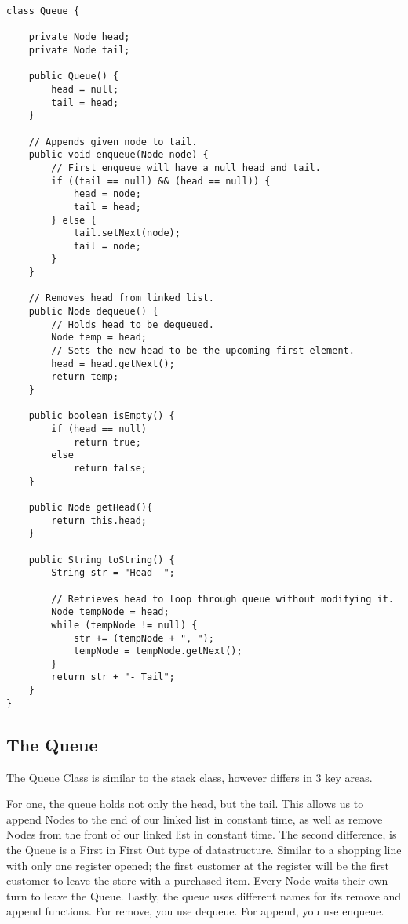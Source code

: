 \documentclass[letterpaper, 10pt,DIV=13]{scrartcl}
\numberwithin{equation}{section} %
\numberwithin{figure}{section} %
\numberwithin{table}{section} %
\begin{document}
\lstset{numbers=left, numberstyle=\tiny, stepnumber=1, numbersep=5pt, basicstyle=\footnotesize\ttfamily}
\begin{lstlisting}[frame=single, ]
class Queue {

    private Node head;
    private Node tail;

    public Queue() {
        head = null;
        tail = head;
    }

    // Appends given node to tail.
    public void enqueue(Node node) {
        // First enqueue will have a null head and tail.
        if ((tail == null) && (head == null)) {
            head = node;
            tail = head;
        } else {
            tail.setNext(node);
            tail = node;
        }
    }

    // Removes head from linked list.
    public Node dequeue() {
        // Holds head to be dequeued.
        Node temp = head;
        // Sets the new head to be the upcoming first element.
        head = head.getNext();
        return temp;
    }

    public boolean isEmpty() {
        if (head == null)
            return true;
        else
            return false;
    }

    public Node getHead(){
        return this.head;
    }

    public String toString() {
        String str = "Head- ";

        // Retrieves head to loop through queue without modifying it.
        Node tempNode = head;
        while (tempNode != null) {
            str += (tempNode + ", ");
            tempNode = tempNode.getNext();
        }
        return str + "- Tail";
    }
}
\end{lstlisting}
\subsection{The Queue}
The Queue Class is similar to the stack class, however differs in 3 key areas. 

For one, the queue holds not only the head, but the tail. This allows us to append Nodes to the end of our linked list in constant time, as well as remove Nodes from the front of our linked list in constant time. The second difference, is the Queue is a First in First Out type of datastructure. Similar to a shopping line with only one register opened; the first customer at the register will be the first customer to leave the store with a purchased item. Every Node waits their own turn to leave the Queue. Lastly, the queue uses different names for its remove and append functions. For remove, you use dequeue. For append, you use enqueue.
\end{document}
